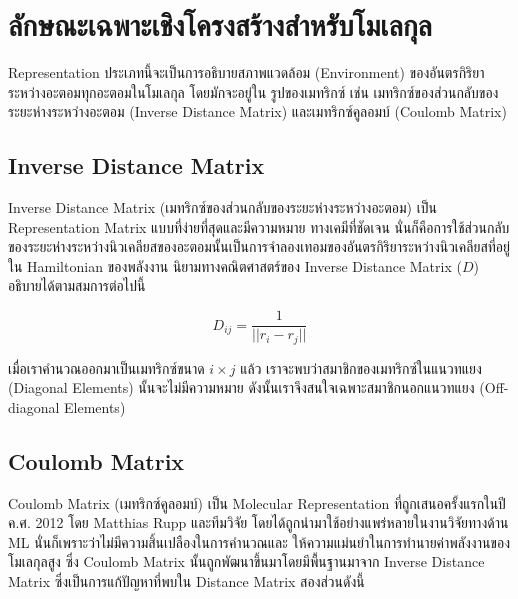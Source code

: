 \section{ลักษณะเฉพาะเชิงโครงสร้างสำหรับโมเลกุล}
\label{sec:struc_feat_mol}

Representation ประเภทนี้จะเป็นการอธิบายสภาพแวดล้อม (Environment) ของอันตรกิริยาระหว่างอะตอมทุกอะตอมในโมเลกุล โดยมักจะอยู่ใน%
รูปของเมทริกซ์ เช่น เมทริกซ์ของส่วนกลับของระยะห่างระหว่างอะตอม (Inverse Distance Matrix) และเมทริกซ์คูลอมบ์ (Coulomb Matrix)

\subsection{Inverse Distance Matrix}
\label{ssec:inv_dist_mat}

Inverse Distance Matrix (เมทริกซ์ของส่วนกลับของระยะห่างระหว่างอะตอม) เป็น Representation Matrix แบบที่ง่ายที่สุดและมีความหมาย%
ทางเคมีที่ชัดเจน นั่นก็คือการใช้ส่วนกลับของระยะห่างระหว่างนิวเคลียสของอะตอมนั้นเป็นการจำลองเทอมของอันตรกิริยาระหว่างนิวเคลียสที่อยู่ใน 
Hamiltonian ของพลังงาน นิยามทางคณิตศาสตร์ของ Inverse Distance Matrix ($D$) อธิบายได้ตามสมการต่อไปนี้

\begin{equation}
    D_{ij} = \frac{1}{||r_{i} - r_{j}||}
\end{equation}

เมื่อเราคำนวณออกมาเป็นเมทริกซ์ขนาด $i \times j$ แล้ว เราจะพบว่าสมาชิกของเมทริกซ์ในแนวทแยง (Diagonal Elements) นั้นจะไม่มีความหมาย 
ดังนั้นเราจึงสนใจเฉพาะสมาชิกนอกแนวทแยง (Off-diagonal Elements)

\subsection{Coulomb Matrix}
\label{ssec:coulomb_mat}

Coulomb Matrix (เมทริกซ์คูลอมบ์) เป็น Molecular Representation ที่ถูกเสนอครั้งแรกในปี ค.ศ. 2012 โดย Matthias Rupp 
และทีมวิจัย\autocite{rupp2012} โดยได้ถูกนำมาใช้อย่างแพร่หลายในงานวิจัยทางด้าน ML นั่นก็เพราะว่าไม่มีความสิ้นเปลืองในการคำนวณและ%
ให้ความแม่นยำในการทำนายค่าพลังงานของโมเลกุลสูง ซึ่ง Coulomb Matrix นั้นถูกพัฒนาขึ้นมาโดยมีพื้นฐานมาจาก Inverse Distance Matrix 
ซึ่งเป็นการแก้ปัญหาที่พบใน Distance Matrix สองส่วนดังนี้

